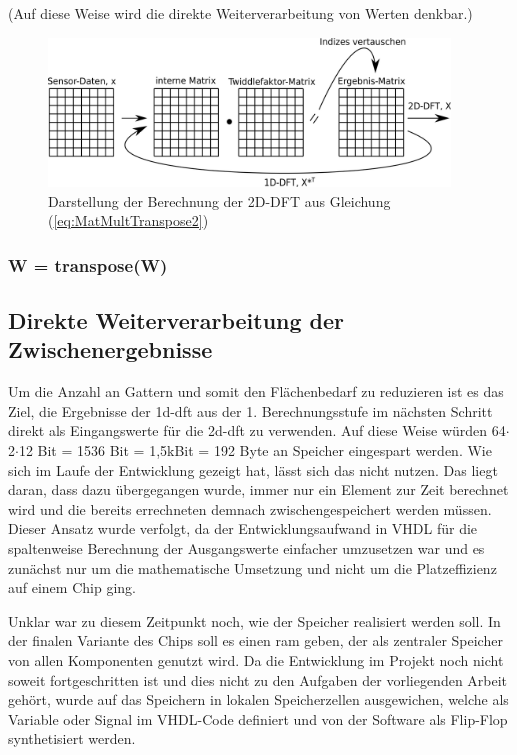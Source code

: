(Auf diese Weise wird die direkte Weiterverarbeitung von Werten denkbar.)
 
\begin{figure}[htbp]
 \centering
 \includegraphics[width=0.95\textwidth]{img/MatMultTranspose2.png}
 \caption{Darstellung der Berechnung der 2D-DFT aus Gleichung (\ref{eq:MatMultTranspose2})}
 \label{pic:MatMultTranspose}
\end{figure}

\subsubsection{W = transpose(W)}

\subsection{Direkte Weiterverarbeitung der Zwischenergebnisse}
Um die Anzahl an Gattern und somit den Flächenbedarf zu reduzieren ist es das Ziel, die Ergebnisse der \gls{1d-dft} aus der 1. Berechnungsstufe im nächsten Schritt direkt als 
Eingangswerte für die \gls{2d-dft} zu verwenden. Auf diese Weise würden 64$\cdot$2$\cdot$12 Bit = 1536 Bit = 1,5kBit = 192 Byte an Speicher eingespart werden.
Wie sich im Laufe der Entwicklung gezeigt hat, lässt sich das nicht nutzen. Das liegt daran, dass dazu übergegangen wurde, immer nur ein Element zur Zeit berechnet wird und die 
bereits errechneten demnach zwischengespeichert werden müssen. Dieser Ansatz wurde verfolgt, da der Entwicklungsaufwand in VHDL für die spaltenweise Berechnung der Ausgangswerte 
einfacher umzusetzen war und es zunächst nur um die mathematische Umsetzung und nicht um die Platzeffizienz auf einem Chip ging.

Unklar war zu diesem Zeitpunkt noch, wie der Speicher realisiert werden soll. In der finalen Variante des Chips soll es einen \gls{ram} geben, der als zentraler
Speicher von allen Komponenten genutzt wird. Da die Entwicklung im Projekt noch nicht soweit fortgeschritten ist und dies nicht zu den Aufgaben der vorliegenden Arbeit gehört,
wurde auf das Speichern in lokalen Speicherzellen ausgewichen, welche als Variable oder Signal im VHDL-Code definiert und von der Software als Flip-Flop synthetisiert werden.



